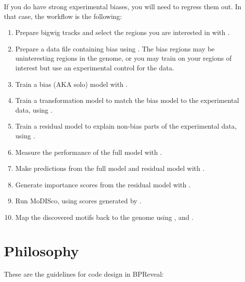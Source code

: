 \documentclass{article}
\begin{document}
If you do have strong experimental biases, you will need to regress them out. In that case, the
workflow is the following:

\begin{enumerate}
    \item Prepare bigwig tracks and select the regions you are interested in with .
    \item Prepare a data file containing bias using . The bias regions
        may be uninteresting regions in the genome, or you may train on your regions of interest
        but use an experimental control for the data.
    \item Train a bias (AKA solo) model with .
    \item Train a transformation model to match the bias model to the experimental data, using .
    \item Train a residual model to explain non-bias parts of the experimental data, using .
    \item Measure the performance of the full model with .
    \item Make predictions from the full model and residual model with .
    \item Generate importance scores from the residual model with .
    \item Run MoDISco, using scores generated by .
    \item Map the discovered motifs back to the genome using ,  and
        .
\end{enumerate}

\newpage

\section{Philosophy}

These are the guidelines for code design in BPReveal:
\end{document}
